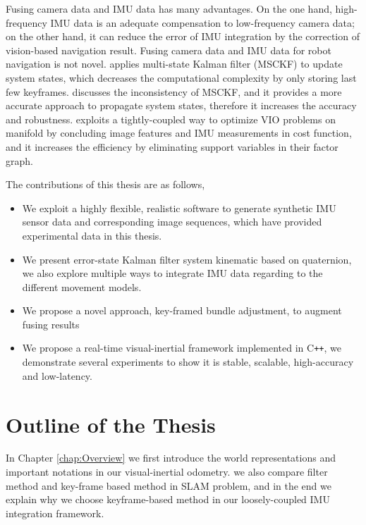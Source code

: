 Fusing camera data and IMU data has many advantages. On the one hand, high-frequency IMU data is an adequate compensation to low-frequency camera data; on the other hand, it can reduce the error of IMU integration by the correction of vision-based navigation result. Fusing camera data and IMU data for robot navigation is not novel. \cite{mourikis2007multi} applies multi-state Kalman filter (MSCKF) to update system states, which decreases the computational complexity by only storing last few keyframes. \cite{hesch2014consistency} discusses the inconsistency of MSCKF, and it provides a more accurate approach to propagate system states, therefore it increases the accuracy and robustness. \cite{forster2015imu} exploits a tightly-coupled way to optimize VIO problems on manifold by concluding image features and IMU measurements in cost function, and it increases the efficiency by eliminating support variables \cite{carlone2014eliminating} in their factor graph. 

The contributions of this thesis are as follows,
\begin{itemize}
\item {We exploit a highly flexible, realistic software to generate synthetic IMU sensor data and corresponding image sequences, which have provided experimental data in this thesis.}
\item {We present error-state Kalman filter system kinematic based on quaternion, we also explore multiple ways to integrate IMU data regarding to the different movement models.}
\item {We propose a novel approach, key-framed bundle adjustment, to augment fusing results}
\item {We propose a real-time visual-inertial framework implemented in C\texttt{++}, we demonstrate several experiments to show it is stable, scalable, high-accuracy and low-latency.}
\end{itemize}

\section{Outline of the Thesis}
\label{sec:outline}

In Chapter \ref{chap:Overview} we first introduce the world representations and important notations in our visual-inertial odometry. we also compare filter method and key-frame based method in SLAM problem, and in the end we explain why we choose keyframe-based method in our loosely-coupled IMU integration framework.

